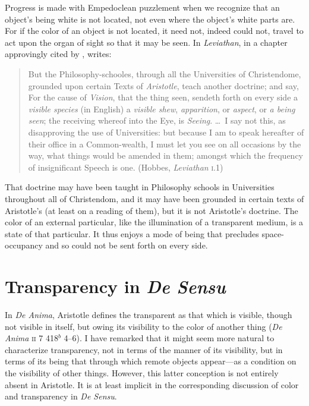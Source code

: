 Progress is made with Empedoclean puzzlement when we recognize that an object's being white is not located, not even where the object's white parts are. For if the color of an object is not located, it need not, indeed could not, travel to act upon the organ of sight so that it may be seen. In \emph{Leviathan}, in a chapter approvingly cited by \citet[26 n7]{Burnyeat:1992fk}, \citet{Hobbes:1651fk} writes:
\begin{quote}
	But the Philosophy-schooles, through all the Universities of Christendome, grounded upon certain Texts of \emph{Aristotle}, teach another doctrine; and say, For the cause of \emph{Vision}, that the thing seen, sendeth forth on every side a \emph{visible species} (in English) a \emph{visible shew}, \emph{apparition}, or \emph{aspect}, or \emph{a being seen}; the receiving whereof into the Eye, is \emph{Seeing}. \ldots\ I say not this, as disapproving the use of Universities: but because I am to speak hereafter of their office in a Common-wealth, I must let you see on all occasions by the way, what things would be amended in them; amongst which the frequency of insignificant Speech is one. (Hobbes, \emph{Leviathan} \textsc{i}.1)
\end{quote}
That doctrine may have been taught in Philosophy schools in Universities throughout all of Christendom, and it may have been grounded in certain texts of Aristotle's (at least on a reading of them), but it is not Aristotle's doctrine. The color of an external particular, like the illumination of a transparent medium, is a state of that particular. It thus enjoys a mode of being that precludes space-occupancy and so could not be sent forth on every side.


\section{Transparency in \emph{De Sensu}} %
\label{sec:transparency_in_de_sensu}

In \emph{De Anima}, Aristotle defines the transparent as that which is visible, though not visible in itself, but owing its visibility to the color of another thing (\emph{De Anima} \textsc{ii} 7 418\( ^{b} \) 4--6). I have remarked that it might seem more natural to characterize transparency, not in terms of the manner of its visibility, but in terms of its being that through which remote objects appear---as a condition on the visibility of other things. However, this latter conception is not entirely absent in Aristotle. It is at least implicit in the corresponding discussion of color and transparency in \emph{De Sensu}.

